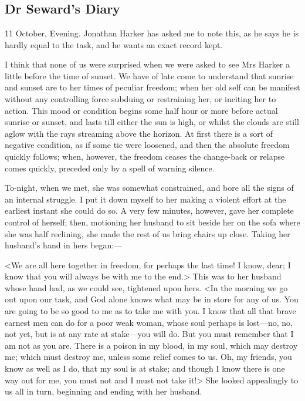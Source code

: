 \chapter[Chapter \thechapter]{}

\section{Dr Seward's Diary}

\begin{diary}{11 October, Evening.}
Jonathan Harker has asked me to note this, as he says he is hardly equal to the task, and he wants an exact record kept.

I think that none of us were surprised when we were asked to see Mrs Harker a little before the time of sunset. We have of late come to understand that sunrise and sunset are to her times of peculiar freedom; when her old self can be manifest without any controlling force subduing or restraining her, or inciting her to action. This mood or condition begins some half hour or more before actual sunrise or sunset, and lasts till either the sun is high, or whilst the clouds are still aglow with the rays streaming above the horizon. At first there is a sort of negative condition, as if some tie were loosened, and then the absolute freedom quickly follows; when, however, the freedom ceases the change-back or relapse comes quickly, preceded only by a spell of warning silence.

To-night, when we met, she was somewhat constrained, and bore all the signs of an internal struggle. I put it down myself to her making a violent effort at the earliest instant she could do so. A very few minutes, however, gave her complete control of herself; then, motioning her husband to sit beside her on the sofa where she was half reclining, she made the rest of us bring chairs up close. Taking her husband's hand in hers began:—

<We are all here together in freedom, for perhaps the last time! I know, dear; I know that you will always be with me to the end.> This was to her husband whose hand had, as we could see, tightened upon hers. <In the morning we go out upon our task, and God alone knows what may be in store for any of us. You are going to be so good to me as to take me with you. I know that all that brave earnest men can do for a poor weak woman, whose soul perhaps is lost—no, no, not yet, but is at any rate at stake—you will do. But you must remember that I am not as you are. There is a poison in my blood, in my soul, which may destroy me; which must destroy me, unless some relief comes to us. Oh, my friends, you know as well as I do, that my soul is at stake; and though I know there is one way out for me, you must not and I must not take it!> She looked appealingly to us all in turn, beginning and ending with her husband.


\end{diary}

